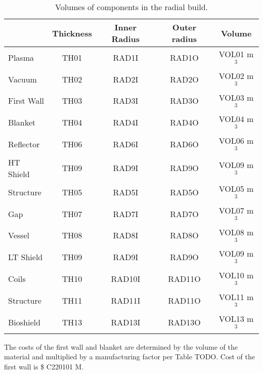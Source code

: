 \begin{table}[ht!]
    \centering
    \begin{tabular}{l c  c c c}
    \hline
        &	Thickness	&	Inner Radius	&	Outer radius	&	Volume		\\
        \hline
Plasma	&	TH01	&	RAD1I	&	RAD1O	&	VOL01	m$^{3}$	\\
Vacuum	&	TH02	&	RAD2I	&	RAD2O	&	VOL02	m$^{3}$	\\
First Wall	&	TH03	&	RAD3I	&	RAD3O	&	VOL03	m$^{3}$	\\
Blanket	&	TH04	&	RAD4I	&	RAD4O	&	VOL04	m$^{3}$	\\
Reflector	&	TH06	&	RAD6I	&	RAD6O	&	VOL06	m$^{3}$	\\
HT Shield	&	TH09	&	RAD9I	&	RAD9O	&	VOL09	m$^{3}$	\\
Structure	&	TH05	&	RAD5I	&	RAD5O	&	VOL05	m$^{3}$	\\
Gap	&	TH07	&	RAD7I	&	RAD7O	&	VOL07	m$^{3}$	\\
Vessel	&	TH08	&	RAD8I	&	RAD8O	&	VOL08	m$^{3}$	\\
LT Shield	&	TH09	&	RAD9I	&	RAD9O	&	VOL09	m$^{3}$	\\
Coils	&	TH10	&	RAD10I	&	RAD11O	&	VOL10	m$^{3}$	\\
Structure	&	TH11	&	RAD11I	&	RAD11O	&	VOL11	m$^{3}$	\\
Bioshield	&	TH13	&	RAD13I	&	RAD13O	&	VOL13	m$^{3}$	\\

        \hline
    \end{tabular}
    \caption{Volumes of components in the radial build.}
    \label{tab:volumes}
\end{table}




The costs of the first wall and blanket are determined by the volume of the material and multiplied by a manufacturing factor per Table TODO.
Cost of the first wall is \$ C220101 M.


